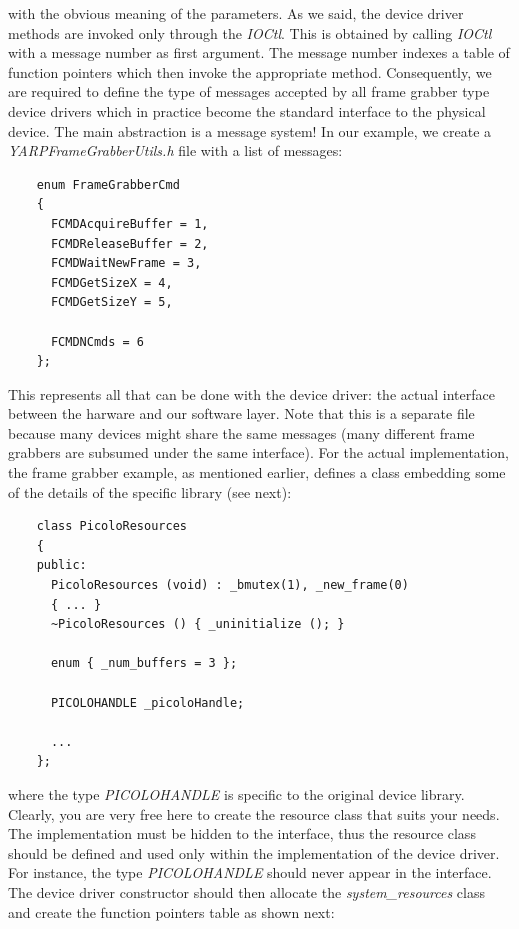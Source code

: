 \noindent with the obvious meaning of the parameters. As we said, the device driver methods are invoked only through the {\em IOCtl}. This is obtained by calling {\em IOCtl} with a message number as first argument. The message number indexes  a table of function pointers which then invoke the appropriate method. Consequently, we are required to define the type of messages accepted by all frame grabber type device drivers which in practice become the standard interface to the physical device. The main abstraction is a message system! In our example, we create a {\em YARPFrameGrabberUtils.h} file with a list of messages:

\begin{verbatim}
    enum FrameGrabberCmd
    {
      FCMDAcquireBuffer = 1,
      FCMDReleaseBuffer = 2,
      FCMDWaitNewFrame = 3,
      FCMDGetSizeX = 4,
      FCMDGetSizeY = 5,

      FCMDNCmds = 6
    };
\end{verbatim}

This represents all that can be done with the device driver: the actual interface between the harware and our software layer. Note that this is a separate file because many devices might share the same messages (many different frame grabbers are subsumed under the same interface). For the actual implementation, the frame grabber example, as mentioned earlier, defines a class embedding some of the details of the specific library (see next):

\begin{verbatim}
    class PicoloResources
    {
    public:
      PicoloResources (void) : _bmutex(1), _new_frame(0)
      { ... }
      ~PicoloResources () { _uninitialize (); }

      enum { _num_buffers = 3 };

      PICOLOHANDLE _picoloHandle;	

      ...
    };
\end{verbatim}

\noindent where the type {\em PICOLOHANDLE} is specific to the original device library. Clearly, you are very free here to create the resource class that suits your needs. The implementation must be hidden to the interface, thus the resource class should be defined and used only within the implementation of the device driver. For instance, the type {\em PICOLOHANDLE} should never appear in the interface. The device driver constructor should then allocate the {\em system\_resources} class and create the function pointers table as shown next:

